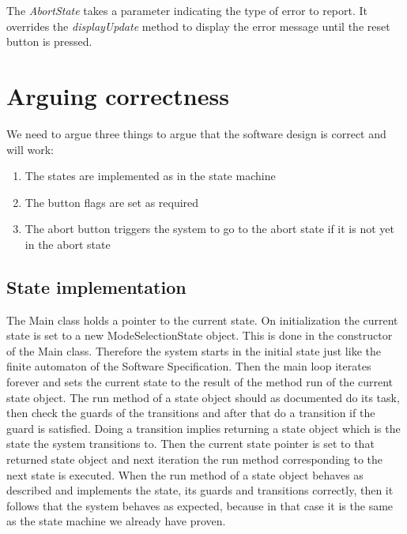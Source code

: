 \documentclass[a4paper,oneside,11pt]{article}
\begin{document}
The \emph{AbortState} takes a parameter indicating the type of error to report. It overrides the \emph{displayUpdate} method to display the error message until the reset button is pressed.

\section{Arguing correctness}
We need to argue three things to argue that the software design is correct and will work:
\begin{enumerate}
\item The states are implemented as in the state machine
\item The button flags are set as required
\item The abort button triggers the system to go to the abort state if it is not yet in the abort state
\end{enumerate}

\subsection{State implementation}
The Main class holds a pointer to the current state. On initialization the current state is set to a new ModeSelectionState object. This is done in the constructor of the Main class. Therefore the system starts in the initial state just like the finite automaton of the Software Specification. Then the main loop iterates forever and sets the current state to the result of the method run of the current state object. The run method of a state object should as documented do its task, then check the guards of the transitions and after that do a transition if the guard is satisfied. Doing a transition implies returning a state object which is the state the system transitions to. Then the current state pointer is set to that returned state object and next iteration the run method corresponding to the next state is executed. When the run method of a state object behaves as described and implements the state, its guards and transitions correctly, then it follows that the system behaves as expected, because in that case it is the same as the state machine we already have proven.
\end{document}
